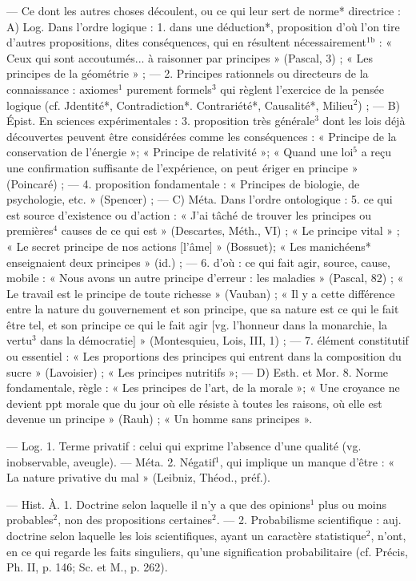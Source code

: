 \begin{itemize}[leftmargin=1cm, label=, itemsep=1pt]
 — Ce dont les autres choses
découlent, ou ce qui leur sert de
norme* directrice : A) Log. Dans
l'ordre logique : 1. dans une déduction*, proposition d’où l’on tire
d’autres propositions, dites conséquences, qui en résultent nécessairement$^\text{1b}$ : « Ceux qui sont accoutumés... à raisonner par principes »
(Pascal, 3) ; « Les principes de la
géométrie » ; — 2. Principes rationnels ou directeurs de la connaissance :
axiomes$^1$ purement formels$^3$ qui
règlent l'exercice de la pensée logique (cf. Jdentité*, Contradiction*.
Contrariété*, Causalité*, Milieu$^2$) ;
— B) Épist. En sciences expérimentales : 3. proposition très générale$^3$
dont les lois déjà découvertes peuvent être considérées comme les
conséquences : « Principe de la conservation de l'énergie »; « Principe
de relativité »; « Quand une loi$^5$ a
reçu une confirmation suffisante de
l'expérience, on peut ériger en
principe » (Poincaré) ; — 4. proposition fondamentale : « Principes
de biologie, de psychologie, etc. »
(Spencer) ; — C) Méta. Dans l’ordre
ontologique : 5. ce qui est source
d'existence ou d’action : « J’ai tâché
de trouver les principes ou premières$^4$
causes de ce qui est » (Descartes,
Méth., VI) ; « Le principe vital » ;
« Le secret principe de nos actions
[l'âme] » (Bossuet); « Les manichéens* enseignaient deux principes »
(id.) ; — 6. d'où : ce qui fait agir,
source, cause, mobile : « Nous avons
un autre principe d'erreur : les maladies » (Pascal, 82) ; « Le travail est
le principe de toute richesse » (Vauban) ; « Il y a cette différence entre
la nature du gouvernement et son
principe, que sa nature est ce qui le
fait être tel, et son principe ce qui le
fait agir [vg. l'honneur dans la monarchie, la vertu$^3$ dans la démocratie] »
(Montesquieu, Lois, III, 1) ;
— 7. élément constitutif ou essentiel : « Les proportions des principes
qui entrent dans la composition du
sucre » (Lavoisier) ; « Les principes
nutritifs »; — D) Esth. et Mor.
8. Norme fondamentale, règle :
« Les principes de l’art, de la morale »; « Une croyance ne devient
ppt morale que du jour où elle
résiste à toutes les raisons, où elle
est devenue un principe » (Rauh) ;
« Un homme sans principes ».

 — Log. 1. Terme privatif :
celui qui exprime l'absence d’une
qualité (vg. inobservable, aveugle).
— Méta. 2. Négatif$^1$, qui implique
un manque d’être : « La nature privative du mal » (Leibniz, Théod.,
préf.).

 — Hist. À. 1. Doctrine
selon laquelle il n’y a que des opinions$^1$ plus ou moins probables$^2$, non
des propositions certaines$^2$. — 2.
Probabilisme scientifique : auj. doctrine selon laquelle les lois scientifiques, ayant un caractère statistique$^2$, n’ont, en ce qui regarde les
faits singuliers, qu'une signification probabilitaire (cf. Précis, Ph. II,
p. 146; Sc. et M., p. 262).


\end{itemize}
